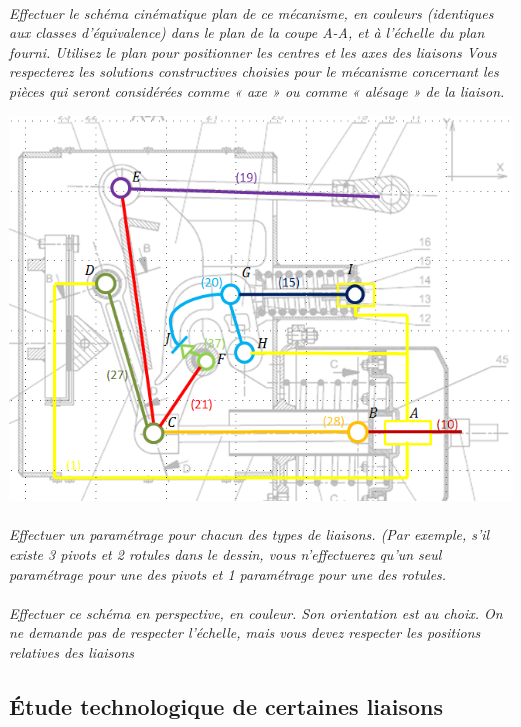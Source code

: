 \documentclass[11pt,oneside]{article}
\begin{document}
\paragraph{}
\textit{Effectuer le schéma cinématique plan de ce mécanisme, en couleurs (identiques aux classes d'équivalence) dans le plan de la coupe A-A, et à l'échelle du plan fourni.
 Utilisez  le plan pour positionner les centres et les axes des liaisons 
 Vous respecterez les solutions constructives choisies pour le mécanisme concernant les pièces qui seront considérées comme « axe » ou comme « alésage » de la liaison.}
\begin{center}
\includegraphics[width=.75\textwidth]{png/schema}
\end{center}

\paragraph{}
\textit{Effectuer un paramétrage pour chacun des types de liaisons. (Par exemple, s'il existe 3 pivots et 2 rotules dans le dessin, vous n'effectuerez qu'un seul paramétrage pour une des pivots et 1 paramétrage pour une des rotules.}


\paragraph{}
\textit{Effectuer ce schéma en perspective, en couleur.
 Son orientation est au choix.
 On ne demande pas de respecter l'échelle, mais vous devez respecter les positions relatives des liaisons}

\subsection{Étude technologique de certaines liaisons}
\end{document}
